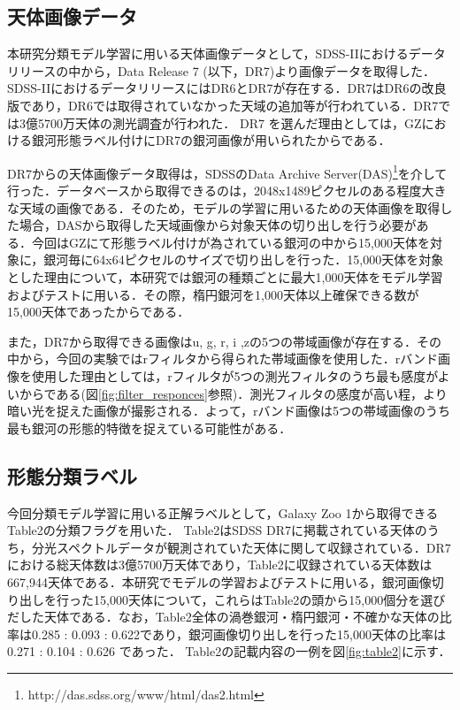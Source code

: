 \documentclass[a4j, 11pt]{jreport}
\begin{document}
\subsection{天体画像データ}
本研究分類モデル学習に用いる天体画像データとして，SDSS-IIにおけるデータリリースの中から，Data Release 7 (以下，DR7)\cite{Abazajian2009}より画像データを取得した．SDSS-IIにおけるデータリリースにはDR6とDR7が存在する．DR7はDR6の改良版であり，DR6では取得されていなかった天域の追加等が行われている．DR7では3億5700万天体の測光調査が行われた．
DR7 を選んだ理由としては，GZにおける銀河形態ラベル付けにDR7の銀河画像が用いられたからである．

DR7からの天体画像データ取得は，SDSSのData Archive Server(DAS)\footnote{http://das.sdss.org/www/html/das2.html}を介して行った．データベースから取得できるのは，2048x1489ピクセルのある程度大きな天域の画像である．そのため，モデルの学習に用いるための天体画像を取得した場合，DASから取得した天域画像から対象天体の切り出しを行う必要がある．今回はGZにて形態ラベル付けが為されている銀河の中から15,000天体を対象に，銀河毎に64x64ピクセルのサイズで切り出しを行った．15,000天体を対象とした理由について，本研究では銀河の種類ごとに最大1,000天体をモデル学習およびテストに用いる．その際，楕円銀河を1,000天体以上確保できる数が15,000天体であったからである．

また，DR7から取得できる画像はu, g, r, i ,zの5つの帯域画像が存在する．その中から，今回の実験ではrフィルタから得られた帯域画像を使用した．rバンド画像を使用した理由としては，rフィルタが5つの測光フィルタのうち最も感度がよいからである(図\ref{fig:filter_responces}参照)．測光フィルタの感度が高い程，より暗い光を捉えた画像が撮影される．よって，rバンド画像は5つの帯域画像のうち最も銀河の形態的特徴を捉えている可能性がある．

\subsection{形態分類ラベル}
今回分類モデル学習に用いる正解ラベルとして，Galaxy Zoo 1から取得できるTable2の分類フラグを用いた．
Table2はSDSS DR7に掲載されている天体のうち，分光スペクトルデータが観測されていた天体に関して収録されている．DR7における総天体数は3億5700万天体であり，Table2に収録されている天体数は667,944天体である．本研究でモデルの学習およびテストに用いる，銀河画像切り出しを行った15,000天体について，これらはTable2の頭から15,000個分を選びだした天体である．なお，Table2全体の渦巻銀河・楕円銀河・不確かな天体の比率は0.285 : 0.093 : 0.622であり，銀河画像切り出しを行った15,000天体の比率は0.271 : 0.104 : 0.626 であった．
Table2の記載内容の一例を図\ref{fig:table2}に示す．
\end{document}
